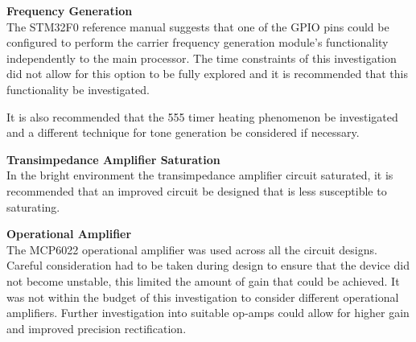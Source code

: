 \textbf{Frequency Generation}\\
The STM32F0 reference manual suggests that one of the GPIO pins could be configured to perform the carrier frequency generation module's functionality independently to the main processor. The time constraints of this investigation did not allow for this option to be fully explored and it is recommended that this functionality be investigated.

It is also recommended that the 555 timer heating phenomenon be investigated and a different technique for tone generation be considered if necessary.

\textbf{Transimpedance Amplifier Saturation}\\
In the bright environment the transimpedance amplifier circuit saturated, it is recommended that an improved circuit be designed that is less susceptible to saturating.

\textbf{Operational Amplifier}\\
The MCP6022 operational amplifier was used across all the circuit designs. Careful consideration had to be taken during design to ensure that the device did not become unstable, this limited the amount of gain that could be achieved. It was not within the budget of this investigation to consider different operational amplifiers. Further investigation into suitable op-amps could allow for higher gain and improved precision rectification.